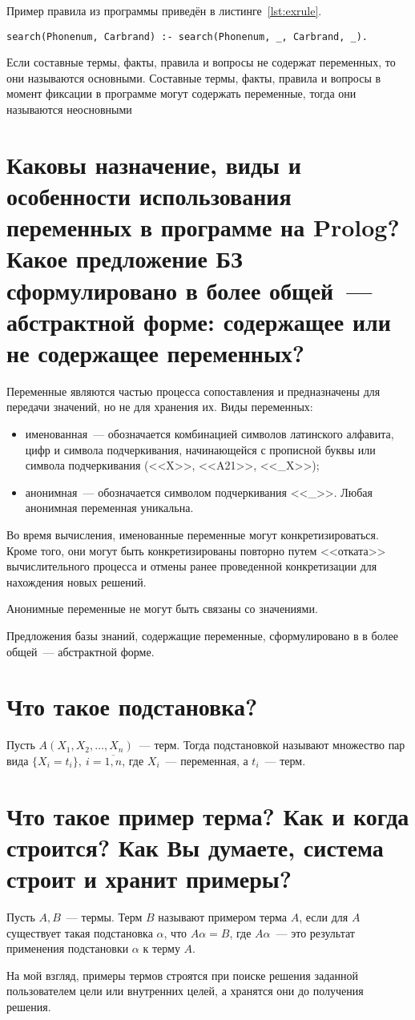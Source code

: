 Пример правила из программы приведён в листинге~\ref{lst:exrule}.
\begin{lstlisting}[caption={Пример правила},label=lst:exrule]
search(Phonenum, Carbrand) :- search(Phonenum, _, Carbrand, _).
\end{lstlisting}

Если составные термы, факты, правила и вопросы не содержат переменных, то они называются основными. Составные термы, факты, правила и вопросы в момент фиксации в программе могут содержать переменные, тогда они называются неосновными

\section{Каковы назначение, виды и особенности использования переменных в программе на Prolog? Какое предложение БЗ сформулировано в более общей~--- абстрактной форме: содержащее или не содержащее переменных?}
Переменные являются частью процесса сопоставления и предназначены для передачи значений, но не для хранения их. Виды переменных:
\begin{itemize}
    \item именованная~--- обозначается комбинацией символов латинского алфавита, цифр и символа подчеркивания, начинающейся с прописной буквы или символа подчеркивания (<<X>>, <<A21>>, <<\_X>>);
    \item анонимная~--- обозначается символом подчеркивания <<\_>>. Любая анонимная переменная уникальна.
\end{itemize}

Во время вычисления, именованные переменные могут конкретизироваться. Кроме того, они могут быть конкретизированы повторно путем <<отката>> вычислительного процесса и отмены ранее проведенной конкретизации для нахождения новых решений.

Анонимные переменные не могут быть связаны со значениями.

Предложения базы знаний, содержащие переменные, сформулировано в в более общей~--- абстрактной форме.

\section{Что такое подстановка?}
Пусть $A(X_1, X_2, \dots, X_n)$~--- терм. Тогда подстановкой называют множество пар вида $\{X_i = t_i\},\ i = \overline{1,n}$, где $X_i$~--- переменная, а $t_i$~--- терм.

\section{Что такое пример терма? Как и когда строится? Как Вы думаете, система строит и хранит примеры?}

Пусть $A, B$~--- термы. Терм $B$ называют примером терма $A$, если для $A$ существует такая подстановка $\alpha$, что $A\alpha= B$, где $A\alpha$~--- это результат применения подстановки $\alpha$ к терму $A$.

На мой взгляд, примеры термов строятся при поиске решения заданной пользователем цели или внутренних целей, а хранятся они до получения решения.


